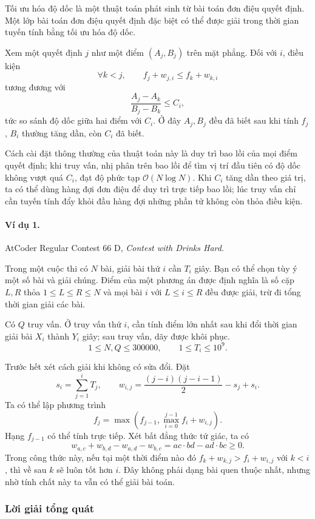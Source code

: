 \documentclass[11pt]{article}
\newcommand{\Oh}{\mathcal{O}}
\begin{document}
Tối ưu hóa độ dốc là một thuật toán phát sinh từ bài toán đơn điệu quyết định.
Một lớp bài toán đơn điệu quyết định đặc biệt có thể được giải trong thời gian
tuyến tính bằng tối ưu hóa độ dốc.

Xem một quyết định \(j\) như một điểm \((A_j,B_j)\) trên mặt phẳng. Đối với
\(i\), điều kiện
\[
  \forall k<j,\qquad f_j+w_{j,i}\le f_k+w_{k,i}
\]
tương đương với
\[
  \frac{A_j-A_k}{B_j-B_k}\le C_i,
\]
tức so sánh độ dốc giữa hai điểm với \(C_i\). Ở đây \(A_j,B_j\) đều đã biết sau
khi tính \(f_j\), \(B_i\) thường tăng dần, còn \(C_i\) đã biết.

Cách cài đặt thông thường của thuật toán này là duy trì bao lồi của mọi điểm
quyết định; khi truy vấn, nhị phân trên bao lồi để tìm vị trí đầu tiên có độ
dốc không vượt quá \(C_i\), đạt độ phức tạp \(\Oh(N\log N)\). Khi \(C_i\) tăng
dần theo giá trị, ta có thể dùng hàng đợi đơn điệu để duy trì trực tiếp bao
lồi; lúc truy vấn chỉ cần tuyến tính đẩy khỏi đầu hàng đợi những phần tử không
còn thỏa điều kiện.

\paragraph{Ví dụ 1.}
AtCoder Regular Contest 66 D, \emph{Contest with Drinks Hard}.

Trong một cuộc thi có \(N\) bài, giải bài thứ \(i\) cần \(T_i\) giây. Bạn có
thể chọn tùy ý một số bài và giải chúng. Điểm của một phương án được định
nghĩa là số cặp \(L,R\) thỏa \(1\le L\le R\le N\) và mọi bài \(i\) với
\(L\le i\le R\) đều được giải, trừ đi tổng thời gian giải các bài.

Có \(Q\) truy vấn. Ở truy vấn thứ \(i\), cần tính điểm lớn nhất sau khi đổi
thời gian giải bài \(X_i\) thành \(Y_i\) giây; sau truy vấn, dãy được khôi
phục.
\[
  1\le N,Q\le 300000,\qquad 1\le T_i\le 10^9.
\]

Trước hết xét cách giải khi không có sửa đổi. Đặt
\[
  s_i=\sum_{j=1}^{i}T_j,\qquad
  w_{i,j}=\frac{(j-i)(j-i-1)}{2}-s_j+s_i.
\]
Ta có thể lập phương trình
\[
  f_j=\max\left(f_{j-1},\max_{i=0}^{j-1} f_i+w_{i,j}\right).
\]
Hạng \(f_{j-1}\) có thể tính trực tiếp. Xét bất đẳng thức tứ giác, ta có
\[
  w_{a,c}+w_{b,d}-w_{a,d}-w_{b,c}=ac\cdot bd-ad\cdot bc\ge 0.
\]
Trong công thức này, nếu tại một thời điểm nào đó
\(f_k+w_{k,j}>f_i+w_{i,j}\) với \(k<i\), thì về sau \(k\) sẽ luôn tốt hơn
\(i\). Đây không phải dạng bài quen thuộc nhất, nhưng nhờ tính chất này ta vẫn
có thể giải bài toán.

\subsubsection{Lời giải tổng quát}
\end{document}
